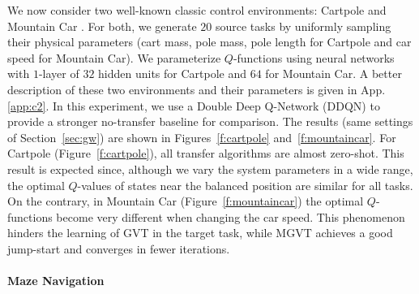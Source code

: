 \documentclass{article}
\begin{document}
We now consider two well-known classic control environments: Cartpole and Mountain Car \citep{sutton1998reinforcement}. For both, we generate $20$ source tasks by uniformly sampling their physical parameters (cart mass, pole mass, pole length for Cartpole and car speed for Mountain Car). We parameterize $Q$-functions using neural networks with $1$-layer of $32$ hidden units for Cartpole and $64$ for Mountain Car. A better description of these two environments and their parameters is given in App. \ref{app:c2}. In this experiment, we use a Double Deep Q-Network (DDQN) \cite{van2016deep} to provide a stronger no-transfer baseline for comparison. The results (same settings of Section~\ref{sec:gw}) are shown in Figures~\ref{f:cartpole} and~\ref{f:mountaincar}. For Cartpole (Figure~\ref{f:cartpole}), all transfer algorithms are almost zero-shot. This result is expected since, although we vary the system parameters in a wide range, the optimal $Q$-values of states near the balanced position are similar for all tasks. On the contrary, in Mountain Car (Figure~\ref{f:mountaincar}) the optimal $Q$-functions become very different when changing the car speed. This phenomenon hinders the learning of GVT in the target task, while MGVT achieves a good jump-start and converges in fewer iterations.

\paragraph{Maze Navigation} \label{sec:mn}

\end{document}
